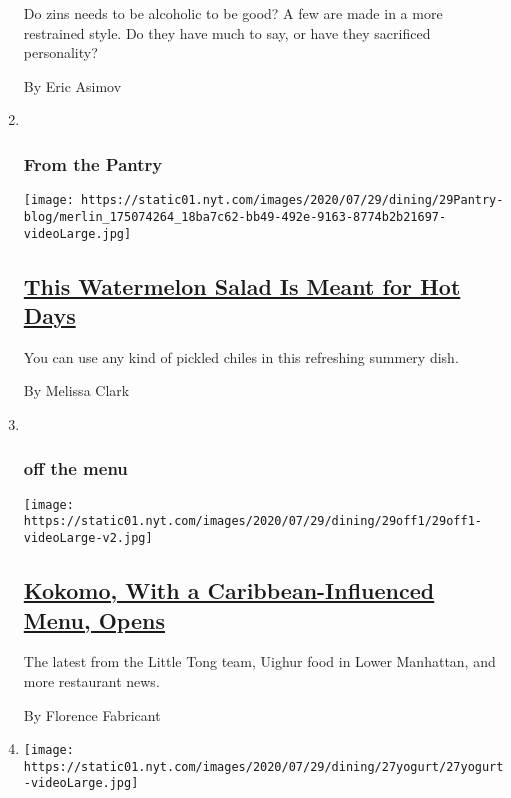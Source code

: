 \begin{enumerate}
  Do zins needs to be alcoholic to be good? A few are made in a more
  restrained style. Do they have much to say, or have they sacrificed
  personality?

  By Eric Asimov
\item ~
  \hypertarget{from-the-pantry}{%
  \subsubsection{From the Pantry}\label{from-the-pantry}}

  \texttt{[image: https://static01.nyt.com/images/2020/07/29/dining/29Pantry-blog/merlin\_175074264\_18ba7c62-bb49-492e-9163-8774b2b21697-videoLarge.jpg]}

  \hypertarget{this-watermelon-salad-is-meant-for-hot-days}{%
  \subsection{\texorpdfstring{\href{/2020/07/29/dining/watermelon-salad-recipe.html}{This
  Watermelon Salad Is Meant for Hot
  Days}}{This Watermelon Salad Is Meant for Hot Days}}\label{this-watermelon-salad-is-meant-for-hot-days}}

  You can use any kind of pickled chiles in this refreshing summery
  dish.

  By Melissa Clark
\item ~
  \hypertarget{off-the-menu}{%
  \subsubsection{off the menu}\label{off-the-menu}}

  \texttt{[image: https://static01.nyt.com/images/2020/07/29/dining/29off1/29off1-videoLarge-v2.jpg]}

  \hypertarget{kokomo-with-a-caribbean-influenced-menu-opens}{%
  \subsection{\texorpdfstring{\href{/2020/07/28/dining/nyc-restaurant-news.html}{Kokomo,
  With a Caribbean-Influenced Menu,
  Opens}}{Kokomo, With a Caribbean-Influenced Menu, Opens}}\label{kokomo-with-a-caribbean-influenced-menu-opens}}

  The latest from the Little Tong team, Uighur food in Lower Manhattan,
  and more restaurant news.

  By Florence Fabricant
\item
  \texttt{[image: https://static01.nyt.com/images/2020/07/29/dining/27yogurt/27yogurt-videoLarge.jpg]}


\end{enumerate}
